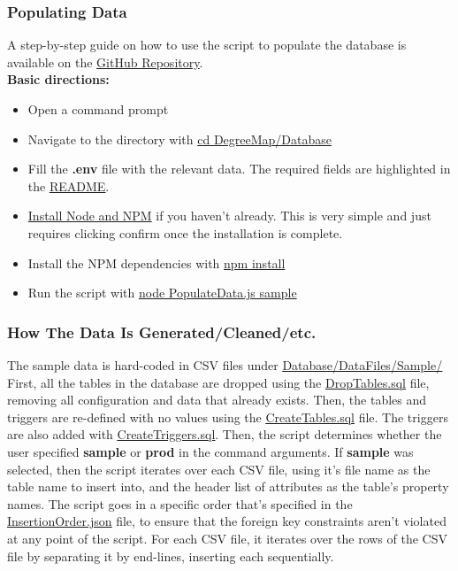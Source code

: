 \documentclass[12pt, a4paper]{article}
\begin{document}
\subsubsection*{Populating Data}
A step-by-step guide on how to use the script to populate the database is available on the \underline{\href{https://github.com/Kggupta/DegreeMap/blob/main/README.md}{GitHub Repository}}.\\
\textbf{Basic directions:}
\begin{itemize}
    \item Open a command prompt
    \item Navigate to the directory with \underline{cd DegreeMap/Database}
    \item Fill the \textbf{.env} file with the relevant data. The required fields are highlighted in the \underline{\href{https://github.com/Kggupta/DegreeMap/blob/main/README.md}{README}}.
    \item \href{https://nodejs.org/en/download}{Install Node and NPM} if you haven't already. This is very simple and just requires clicking confirm once the installation is complete.
    \item Install the NPM dependencies with \underline{npm install}
    \item Run the script with
    \underline{node PopulateData.js sample}
\end{itemize}
\subsubsection*{How The Data Is Generated/Cleaned/etc.}
The sample data is hard-coded in CSV files under \underline{\href{https://github.com/Kggupta/DegreeMap/tree/main/Database/DataFiles/Sample}{Database/DataFiles/Sample/}}\\

First, all the tables in the database are dropped using the \underline{\href{https://github.com/Kggupta/DegreeMap/tree/main/Database/Queries}{DropTables.sql}} file, removing all configuration and data that already exists. Then, the tables and triggers are re-defined with no values using the \underline{\href{https://github.com/Kggupta/DegreeMap/tree/main/Database/Queries}{CreateTables.sql}} file. The triggers are also added with \underline{\href{https://github.com/Kggupta/DegreeMap/tree/main/Database/Queries}{CreateTriggers.sql}}. Then, the script determines whether the user specified \textbf{sample} or \textbf{prod} in the command arguments. If \textbf{sample} was selected, then the script iterates over each CSV file, using it's file name as the table name to insert into, and the header list of attributes as the table's property names. The script goes in a specific order that's specified in the \underline{\href{https://github.com/Kggupta/DegreeMap/blob/main/Database/InsertionOrder.json}{InsertionOrder.json}} file, to ensure that the foreign key constraints aren't violated at any point of the script. For each CSV file, it iterates over the rows of the CSV file by separating it by end-lines, inserting each sequentially.
\end{document}
